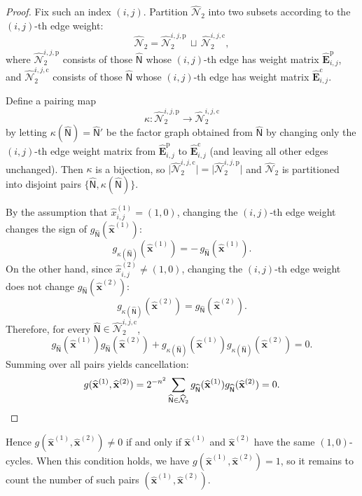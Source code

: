 \documentclass[conference]{IEEEtran}
\theoremstyle{plain}
\theoremstyle{definition}
\newcommand{\sfn}{\mathsf{N}}
\newcommand{\hatx}[1]{\widehat{x}_{ #1 }}
\newcommand{\hatbfx}[1][]{\widehat{\mathbf{x}}^{ #1 }}
\begin{document}
 \begin{proof}
  Fix such an index $(i,j)$. Partition $\widehat{\mathcal N}_2$ into two subsets according to
  the $(i,j)$-th edge weight:
  \[
   \widehat{\mathcal N}_2
   =\widehat{\mathcal N}_2^{i,j,\mathrm p}\,\sqcup\,\widehat{\mathcal N}_2^{i,j,\mathrm c},
  \]
  where $\widehat{\mathcal N}_2^{i,j,\mathrm p}$ consists of those
  $\widehat{\sfn}$ whose $(i,j)$-th edge has weight matrix $\widehat{\mathbf
  E}^{\mathrm p}_{i,j}$, and $\widehat{\mathcal N}_2^{i,j,\mathrm c}$ consists
  of those $\widehat{\sfn}$ whose $(i,j)$-th edge has weight matrix
  $\widehat{\mathbf E}^{\mathrm c}_{i,j}$.

  Define a pairing map
  \[
   \kappa:\widehat{\mathcal N}_2^{i,j,\mathrm p}\to \widehat{\mathcal N}_2^{i,j,\mathrm c}
  \]
  by letting $\kappa(\widehat{\sfn})=\widehat{\sfn}'$ be the factor graph
  obtained from $\widehat{\sfn}$ by changing only the $(i,j)$-th edge weight
  matrix from $\widehat{\mathbf E}^{\mathrm p}_{i,j}$ to $\widehat{\mathbf
  E}^{\mathrm c}_{i,j}$ (and leaving all other edges unchanged). Then $\kappa$
  is a bijection, so $\bigl|\widehat{\mathcal N}_2^{i,j,\mathrm c}\bigr|
  =\bigl|\widehat{\mathcal N}_2^{i,j,\mathrm p}\bigr|$ and $\widehat{\mathcal
  N}_2$ is partitioned into disjoint pairs
  $\{\widehat{\sfn},\kappa(\widehat{\sfn})\}$.

  By the assumption that $\hatx{i,j}^{(1)}=(1,0)$, changing the $(i,j)$-th edge
  weight changes the sign of $g_{\widehat{\sfn}}(\hatbfx[(1)])$:
  \[
   g_{\kappa(\widehat{\sfn})}(\hatbfx[(1)])=-\,g_{\widehat{\sfn}}(\hatbfx[(1)]).
  \]
  On the other hand, since $\hatx{i,j}^{(2)}\neq (1,0)$, changing the
  $(i,j)$-th edge weight does not change $g_{\widehat{\sfn}}(\hatbfx[(2)])$:
  \[
   g_{\kappa(\widehat{\sfn})}(\hatbfx[(2)])=g_{\widehat{\sfn}}(\hatbfx[(2)]).
  \]
  Therefore, for every $\widehat{\sfn}\in\widehat{\mathcal N}_2^{i,j,\mathrm
  c}$,
  \[
   g_{\widehat{\sfn}}(\hatbfx[(1)])g_{\widehat{\sfn}}(\hatbfx[(2)])
   +
   g_{\kappa(\widehat{\sfn})}(\hatbfx[(1)])g_{\kappa(\widehat{\sfn})}(\hatbfx[(2)])=0.
  \]
  Summing over all pairs yields cancellation:
  \[
   g(\hatbfx[(1)],\hatbfx[(2)])
   =2^{-n^2}\sum_{\widehat{\sfn}\in\widehat{\mathcal N}_2}
   g_{\widehat{\sfn}}(\hatbfx[(1)])g_{\widehat{\sfn}}(\hatbfx[(2)])=0. \qedhere
  \]
 \end{proof}

 Hence $g(\hatbfx[(1)],\hatbfx[(2)])\neq 0$ if and only if $\hatbfx[(1)]$ and
 $\hatbfx[(2)]$ have the same $(1,0)$-cycles. When this condition holds, we
 have $g(\hatbfx[(1)],\hatbfx[(2)])=1$, so it remains to count the number of
 such pairs $(\hatbfx[(1)],\hatbfx[(2)])$.
\end{document}

